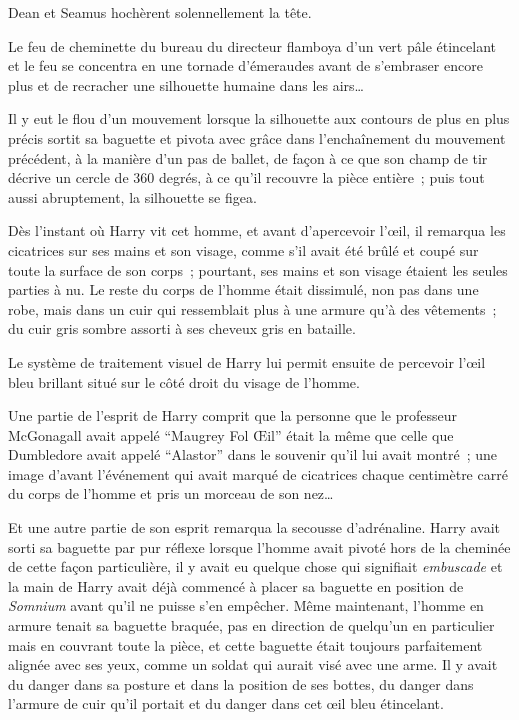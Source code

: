 Dean et Seamus hochèrent solennellement la tête.


Le feu de cheminette du bureau du directeur flamboya d'un vert pâle étincelant et le feu se concentra en une tornade d'émeraudes avant de s'embraser encore plus et de recracher une silhouette humaine dans les airs…

Il y eut le flou d'un mouvement lorsque la silhouette aux contours de plus en plus précis sortit sa baguette et pivota avec grâce dans l'enchaînement du mouvement précédent, à la manière d'un pas de ballet, de façon à ce que son champ de tir décrive un cercle de 360 degrés, à ce qu'il recouvre la pièce entière~; puis tout aussi abruptement, la silhouette se figea.

Dès l'instant où Harry vit cet homme, et avant d'apercevoir l'œil, il remarqua les cicatrices sur ses mains et son visage, comme s'il avait été brûlé et coupé sur toute la surface de son corps~; pourtant, ses mains et son visage étaient les seules parties à nu. Le reste du corps de l'homme était dissimulé, non pas dans une robe, mais dans un cuir qui ressemblait plus à une armure qu'à des vêtements~; du cuir gris sombre assorti à ses cheveux gris en bataille.

Le système de traitement visuel de Harry lui permit ensuite de percevoir l'œil bleu brillant situé sur le côté droit du visage de l'homme.

Une partie de l'esprit de Harry comprit que la personne que le professeur McGonagall avait appelé “Maugrey Fol Œil” était la même que celle que Dumbledore avait appelé “Alastor” dans le souvenir qu'il lui avait montré~; une image d'avant l'événement qui avait marqué de cicatrices chaque centimètre carré du corps de l'homme et pris un morceau de son nez…

Et une autre partie de son esprit remarqua la secousse d'adrénaline. Harry avait sorti sa baguette par pur réflexe lorsque l'homme avait pivoté hors de la cheminée de cette façon particulière, il y avait eu quelque chose qui signifiait \emph{embuscade} et la main de Harry avait déjà commencé à placer sa baguette en position de \emph{Somnium} avant qu'il ne puisse s'en empêcher. Même maintenant, l'homme en armure tenait sa baguette braquée, pas en direction de quelqu'un en particulier mais en couvrant toute la pièce, et cette baguette était toujours parfaitement alignée avec ses yeux, comme un soldat qui aurait visé avec une arme. Il y avait du danger dans sa posture et dans la position de ses bottes, du danger dans l'armure de cuir qu'il portait et du danger dans cet œil bleu étincelant.

